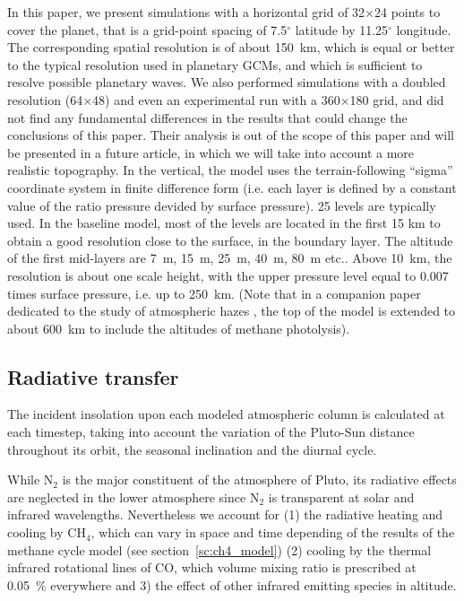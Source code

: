 In this paper, we present simulations with a horizontal grid of 
32$\times$24
points to cover the planet,
that is a grid-point spacing 
of 7.5$^{\circ}$ latitude by 11.25$^{\circ}$ longitude.
The corresponding
spatial resolution is of about 150~km, which is equal or better to the typical resolution used in
planetary GCMs, and which is sufficient to resolve possible planetary waves. We also performed
simulations with a doubled resolution (64$\times$48) and even an experimental  run 
with a 360$\times$180 
grid, and did
not find any fundamental differences in the results that could change the conclusions of this
paper. Their analysis is out of the scope of this paper and will be presented in a future article,
in which we will take into account a more realistic topography.  
In the vertical, the model uses the terrain-following ``sigma''
coordinate system in finite difference form (i.e. each layer is defined by a constant value
of the ratio pressure devided by surface pressure). 25 levels are typically used.
In the baseline model,
most of the levels are located in the first 15 km to obtain a good resolution close 
to the surface, in the boundary layer. The altitude of the first mid-layers are 7~m, 15~m, 25~m,
40~m, 80~m etc.. Above 10~km, the resolution is about one scale height, with the upper pressure 
level equal to 0.007 times surface pressure, i.e. up to 250~km. (Note that in a companion paper dedicated to the study of 
atmospheric hazes \cite{Bert:16ica}, the top of the model is 
extended to about 600~km to include the altitudes of methane photolysis). 


\subsection{Radiative transfer}

\label{sc:radia}

The incident insolation upon each modeled atmospheric 
column is calculated at each timestep, taking into
account the variation of the Pluto-Sun distance throughout its orbit, the seasonal
inclination and the diurnal cycle. 

While N$_2$ is the major constituent of the atmosphere of Pluto, its
radiative effects are neglected in the lower atmosphere since
N$_2$ is transparent at solar and infrared wavelengths. 
Nevertheless we account for (1) the radiative
heating and cooling by CH$_4$, which can vary in space and time depending of the results of the
methane cycle model (see section~\ref{sc:ch4_model}) (2) cooling by the thermal infrared 
rotational lines of CO, which volume mixing ratio is prescribed at 0.05~\%
everywhere \cite[]{Lell:11co,Lell:16} and 3) the effect of other infrared emitting species in altitude.  


